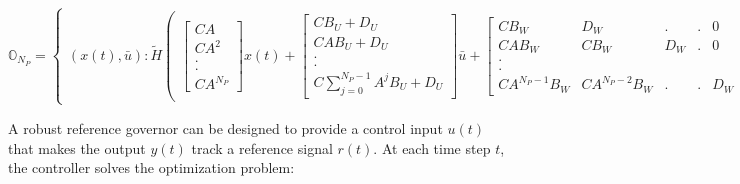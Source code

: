 \documentclass[letterpaper, 10 pt, conference]{ieeeconf}  %
\begin{document}
    \begin{table}[t]
    	\begin{equation}
    	\mathbb{O}_{N_P}= \begin{Bmatrix}
    	(x(t),\bar{u}):
    	\tilde{H}
    	\begin{pmatrix}
    	\begin{bmatrix}
    	CA \\ CA^2 \\ . \\ . \\ CA^{N_P}
    	\end{bmatrix}x(t) +
    	\begin{bmatrix}
    	CB_U+D_U \\ CAB_U+D_U \\ . \\ . \\ C\sum\limits_{j=0}^{N_P-1}A^{j}B_U + D_{U}
    	\end{bmatrix}\bar{u} + 
    	\begin{bmatrix}
    	CB_W & D_W & . & .  & 0 \\ CAB_W & CB_W & D_W & . & 0 \\ . \\ . \\ CA^{N_P-1}B_W & CA^{N_P-2}B_W & . & . & D_W
    	\end{bmatrix}
    	\begin{bmatrix}
    	w(t) \\ w(t+1) \\ . \\ . \\ w(t+N_P)
    	\end{bmatrix} 
    	\end{pmatrix}
    	\leq
    	\tilde{h}
    	\end{Bmatrix}
    	\label{full_ONP}
    	\end{equation}
    \end{table}
  A robust reference governor can be designed to provide a control input $u(t)$ that makes the output $y(t)$ 
  track a reference signal $r(t)$. At each time step $t$, the controller solves the optimization problem:
\end{document}
